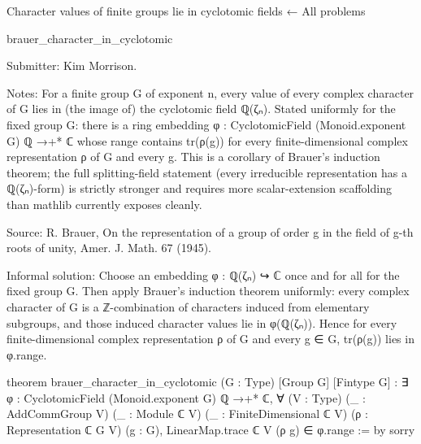 Character values of finite groups lie in cyclotomic fields
← All problems

brauer_character_in_cyclotomic

Submitter: Kim Morrison.

Notes: For a finite group G of exponent n, every value of every complex character of G lies in (the image of) the cyclotomic field ℚ(ζₙ). Stated uniformly for the fixed group G: there is a ring embedding φ : CyclotomicField (Monoid.exponent G) ℚ →+* ℂ whose range contains tr(ρ(g)) for every finite-dimensional complex representation ρ of G and every g. This is a corollary of Brauer's induction theorem; the full splitting-field statement (every irreducible representation has a ℚ(ζₙ)-form) is strictly stronger and requires more scalar-extension scaffolding than mathlib currently exposes cleanly.

Source: R. Brauer, On the representation of a group of order g in the field of g-th roots of unity, Amer. J. Math. 67 (1945).

Informal solution: Choose an embedding φ : ℚ(ζₙ) ↪ ℂ once and for all for the fixed group G. Then apply Brauer's induction theorem uniformly: every complex character of G is a ℤ-combination of characters induced from elementary subgroups, and those induced character values lie in φ(ℚ(ζₙ)). Hence for every finite-dimensional complex representation ρ of G and every g ∈ G, tr(ρ(g)) lies in φ.range.

theorem brauer_character_in_cyclotomic (G : Type) [Group G] [Fintype G] :
    ∃ φ : CyclotomicField (Monoid.exponent G) ℚ →+* ℂ,
      ∀ (V : Type) (_ : AddCommGroup V) (_ : Module ℂ V) (_ : FiniteDimensional ℂ V)
        (ρ : Representation ℂ G V) (g : G),
        LinearMap.trace ℂ V (ρ g) ∈ φ.range := by
  sorry